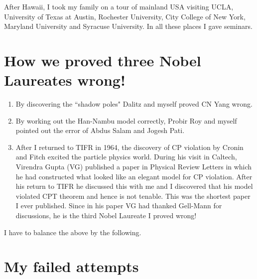 After Hawaii, I took my family on a tour of mainland USA visiting UCLA, 
University of Texas at Austin, Rochester University, City College of New 
York, Maryland University and Syracuse University. In all these places I 
gave seminars.

\section*{How we proved three Nobel Laureates wrong!}

\begin{enumerate}
\itemsep=0pt
\item By discovering the ``shadow poles" Dalitz and myself pro\-ved CN Yang 
wrong.
\item By working out the Han-Nambu model correctly, Probir Roy and myself 
pointed out the error of Abdus Salam and Jogesh Pati.
\item After I returned to TIFR in 1964, the discovery of CP vio\-lation by 
Cronin and Fitch excited the particle physics wo\-rld. During his visit in 
Caltech, Virendra Gupta (VG) published a paper in Physical Review 
Letters in which he had constructed what looked like an elegant model 
for CP violation. After his return to TIFR he discussed this with me and 
I discovered that his model violated CPT theorem and hence is not 
tenable. This was the shortest paper I ever published. Since in his 
paper VG had thanked Gell-Mann for discussions, he is the third Nobel 
Laureate I proved wrong!
\end{enumerate}

I have to balance the above by the following.
\newpage
\section*{My failed attempts}

